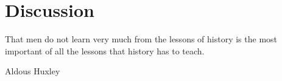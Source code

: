 
\section{Discussion}
\label{ch:discussion}

\epigraph{That men do not learn very much from the lessons of history is the most important of all the lessons that history has to teach.}{Aldous Huxley}

\cleardoublepage
